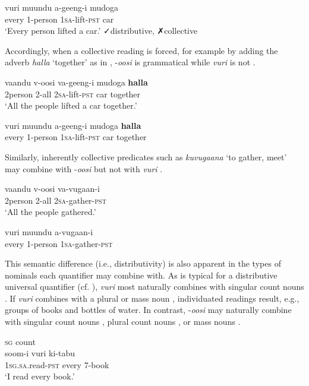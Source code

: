 \documentclass[output=paper]{langsci/langscibook}
\begin{document}
\ea
\gll vuri  muundu  a-geeng-i    mudoga\\
     every  1-person  1\textsc{sa}-lift-\textsc{pst}    car\\
\glt ‘Every person lifted a car.’  ✓distributive, ✗collective
\z

Accordingly, when a collective reading is forced, for example by adding the adverb \textit{halla} ‘together’ as in , -\textit{oosi} is grammatical  while \textit{vuri} is not .    

\ea 
\gll vaandu    v-oosi  va-geeng-i    mudoga  \textbf{halla}\\
     2person  2-all  2\textsc{sa}-lift-\textsc{pst}  car    together\\
\glt ‘All the people lifted a car together.’
\z

\ea
\gll *vuri  muundu  a-geeng-i  mudoga  \textbf{halla}\\
     every  1-person  1\textsc{sa}-lift-\textsc{pst}  car    together\\
\z

Similarly, inherently collective predicates such as \textit{kuvugaana} ‘to gather, meet’ may combine with -\textit{oosi}  but not with \textit{vuri} .

\ea
\gll vaandu  v-oosi    va-vugaan-i\\
     2person  2-all    2\textsc{sa}-gather-\textsc{pst}  \\
\glt ‘All the people gathered.’
\z

\ea
\gll *vuri  muundu  a-vugaan-i  \\
     every  1-person  1\textsc{sa}-gather-\textsc{pst}  \\
\z

This semantic difference (i.e., distributivity) is also apparent in the types of nominals each quantifier may combine with. As is typical for a distributive universal quantifier (cf. \citealt{Gil1995}), \textit{vuri} most naturally combines with singular count nouns . If \textit{vuri} combines with a plural  or mass noun , individuated readings result, e.g., groups of books and bottles of water. In contrast, -\textit{oosi} may naturally combine with singular count nouns , plural count nouns , or mass nouns .

\ea
\textsc{sg} count\\
\gll soom-i      vuri    ki-tabu    \\
     1\textsc{sg.sa}.read-\textsc{pst}  every    7-book  \\
\glt ‘I read every book.’
\z
\end{document}
